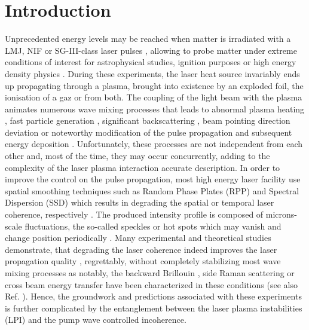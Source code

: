 \documentclass[
 reprint,
 amsmath,amssymb,
 aps,
]{revtex4-1}
\begin{document}
\section{Introduction}
Unprecedented energy levels may be reached when matter is irradiated with a LMJ, NIF or SG-III-class laser pulses \cite{Cavailler_2005,Lindl_2004,MRE_Zheng_2017}, allowing to probe matter under extreme conditions of interest for astrophysical studies, ignition purposes or high energy density physics \cite[]{Drake2006}.
During these experiments, the laser heat source invariably ends up propagating through a plasma, brought  into existence by  an exploded foil,  the ionisation of a gaz or from both. 
The coupling of the light beam with the plasma animates numerous wave mixing processes that leads to abnormal plasma heating \cite[]{PRL_Schurtz_2009}, fast particle generation \cite[]{POP_Rousseaux_2002,MRE_Tikhonchuk_2021},  significant backscattering  \cite[]{POP_MacGowan_1996,POP_Montgomery_1998,POP_Huller_2020}, beam pointing direction deviation \cite[]{PRL_Moody_96,PRL_Hinkel_1996} or   noteworthy modification of the pulse propagation and subsequent energy deposition  \cite[]{POP_Schmitt_Afeyan_98,POP_Grech_2006}.
Unfortunately, these processes are not independent from each other and, most of the time, they may occur concurrently, adding to the complexity of the laser plasma interaction accurate description. 
In order to improve the control on the pulse propagation, most high energy laser facility use spatial smoothing techniques such as Random Phase Plates (RPP)  and Spectral Dispersion (SSD) which results in degrading the spatial or temporal laser coherence, respectively \cite[]{Kato_1984,Skupski_1989}. 
The produced intensity profile is composed of microns-scale fluctuations, the so-called speckles or hot spots which may vanish and change position periodically  \cite[]{Garnier_1999,Garnier_2001,POP_Duluc_2019}.
Many experimental and theoretical studies demonstrate, that degrading the laser coherence indeed improves the laser propagation quality \cite[]{POP_Hinkel_1998,PRL_Myatt_2001,NatPhys_Glenzer,NatPhys_Labaune,PRL_Grech_2009}, regrettably, without completely stabilizing most wave mixing processes as notably, the backward Brillouin \cite[]{JRE_Moody_93,Berger_1995}, side  Raman scattering \cite[]{PRE_Michel_2019} or  cross beam energy transfer \cite[]{PRL_Michel_2009,Glenzer2010,PRL_Neuville_2016cbet,PTA_Huller_2020} have been characterized in these conditions (see also Ref. \cite[]{Kirkwood_2013}). 
Hence, the groundwork and predictions associated with these experiments is further complicated by the entanglement between the  laser plasma instabilities (LPI) and the pump wave controlled incoherence.
\end{document}
